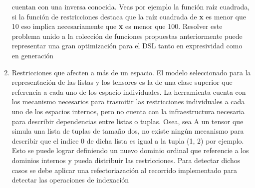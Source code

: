 \begin{recomendations}
\begin{enumerate}
              cuentan con una inversa conocida. Veas por ejemplo la función raíz cuadrada, si la función de
              restricciones destaca que la raíz cuadrada de {\bf x} es menor que 10 eso implica necesariamente
              que {\bf x} es menor que 100. Resolver este problema unido a la colección de funciones propuestas
              anteriormente puede representar una gran optimización para el DSL tanto en expresividad como en
              generación
        \item   Restricciones que afecten a más de un espacio. El modelo seleccionado para la representación
              de las listas y los tensores es la de una clase superior que referencia a cada uno de los espacio
              individuales. La herramienta cuenta con los mecanismo necesarios para trasmitir las restricciones
              individuales a cada uno de los espacios internos, pero no cuenta con la infraestructura necesaria
              para describir dependencias entre listas o tuplas. Osea, sea A un tensor que simula una lista de
              tuplas de tamaño dos, no existe ningún mecanismo para describir que el indice 0 de dicha lista es
              igual a la tupla (1, 2) por ejemplo. Esto se puede lograr definiendo un nuevo dominio ordinal que
              referencie a los dominios internos y pueda distribuir las restricciones. Para detectar dichos casos
              se debe aplicar una refectoriazación al recorrido implementado para detectar las operaciones de
              indexación
    \end{enumerate}
\end{recomendations}
